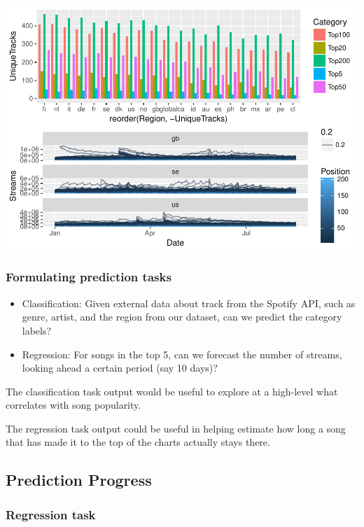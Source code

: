 \documentclass[]{article}
\providecommand{\tightlist}{%
  \setlength{\itemsep}{0pt}\setlength{\parskip}{0pt}}
\begin{document}
\includegraphics{report-2_files/figure-latex/regionvariation-1.pdf}

\subsubsection{Formulating prediction
tasks}\label{formulating-prediction-tasks}

\begin{itemize}
\tightlist
\item
  Classification: Given external data about track from the Spotify API,
  such as genre, artist, and the region from our dataset, can we predict
  the category labels?
\item
  Regression: For songs in the top 5, can we forecast the number of
  streams, looking ahead a certain period (say 10 days)?
\end{itemize}

The classification task output would be useful to explore at a
high-level what correlates with song popularity.

The regression task output could be useful in helping estimate how long
a song that has made it to the top of the charts actually stays there.

\subsection{Prediction Progress}\label{prediction-progress}

\subsubsection{Regression task}\label{regression-task}
\end{document}
